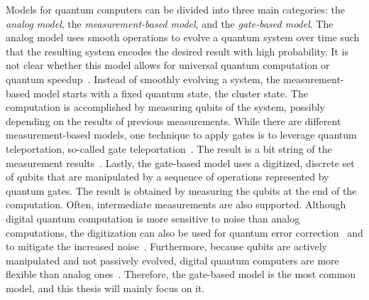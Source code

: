 Models for quantum computers can be divided into three main categories: the \emph{analog model}, the \emph{measurement-based model}, and the \emph{gate-based model}. The analog model uses smooth operations to evolve a quantum system over time such that the resulting system encodes the desired result with high probability. It is not clear whether this model allows for universal quantum computation or quantum speedup~\cite{DiCh20b}. Instead of smoothly evolving a system, the measurement-based model starts with a fixed quantum state, the cluster state. The computation is accomplished by measuring qubits of the system, possibly depending on the results of previous measurements. While there are different measurement-based models, one technique to apply gates is to leverage quantum teleportation, so-called gate teleportation~\cite{Jozs05}. The result is a bit string of the measurement results~\cite{DiCh20b, Niel06}. Lastly, the gate-based model uses a digitized, discrete set of qubits that are manipulated by a sequence of operations represented by quantum gates. The result is obtained by measuring the qubits at the end of the computation. Often, intermediate measurements are also supported.
Although digital quantum computation is more sensitive to noise than analog computations, the digitization can also be used for quantum error correction~\cite{DMN13} and to mitigate the increased noise~\cite{DiCh20b}. Furthermore, because qubits are actively manipulated and not passively evolved, digital quantum computers are more flexible than analog ones~\cite{RDB*22}. Therefore, the gate-based model is the most common model, and this thesis will mainly focus on it. 

